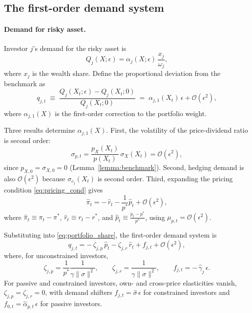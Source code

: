 \subsection{The first-order demand system}

\paragraph{Demand for risky asset.}  
Investor $j$’s demand for the risky asset is 
\[
    Q_j(X;\epsilon)=\alpha_j(X;\epsilon)\,\frac{x_j}{\omega_j},
\]
where $x_j$ is the wealth share. Define the proportional deviation from the benchmark as
\begin{equation}
    q_{j,t}\;\equiv\;\frac{Q_j(X_t;\epsilon)- Q_j(X_t;0)}{Q_j(X_t;0)}
    \;=\;\alpha_{j,1}(X_t)\,\epsilon+\mathcal{O}(\epsilon^2),
\end{equation}
where $\alpha_{j,1}(X)$ is the first-order correction to the portfolio weight.  

Three results determine $\alpha_{j,1}(X)$. First, the volatility of the price-dividend ratio is second order:
\[
    \sigma_{p,t}=\frac{p_X(X_t)}{p(X_t)}\,\sigma_X(X_t)=\mathcal{O}(\epsilon^2),
\]
since $p_{X,0}=\sigma_{X,0}=0$ (Lemma~\ref{lemma:benchmark}). Second, hedging demand is also $\mathcal{O}(\epsilon^2)$ because $\sigma_{c_j}(X_t)$ is second order. Third, expanding the pricing condition \eqref{eq:pricing_cond} gives
\begin{equation}
    \hat{\pi}_t=-\,\hat{r}_t-\frac{1}{p^*}\hat{p}_t+\mathcal{O}(\epsilon^2),
\end{equation}
where $\hat{\pi}_t\equiv \pi_t-\pi^*$, $\hat{r}_t\equiv r_t-r^*$, and $\hat{p}_t\equiv \frac{p_t-p^*}{p^*}$, using $\mu_{p,t}=\mathcal{O}(\epsilon^2)$.

Substituting into \eqref{eq:portfolio_share}, the first-order demand system is
\begin{equation}\label{eq:demand_risky}
    q_{j,t}=-\,\zeta_{j,p}\,\hat{p}_t-\zeta_{j,r}\,\hat{r}_t+f_{j,t}+\mathcal{O}(\epsilon^2),
\end{equation}
where, for unconstrained investors,
\[
    \zeta_{j,p}=\frac{1}{p^*}\frac{1}{\gamma\|\sigma\|^2}, 
    \qquad
    \zeta_{j,r}=\frac{1}{\gamma\|\sigma\|^2}, 
    \qquad
    f_{j,t}=-\,\hat{\gamma}_j\,\epsilon.
\]
For passive and constrained investors, own- and cross-price elasticities vanish, $\zeta_{j,p}=\zeta_{j,r}=0$, with demand shifters $f_{j,t}=\hat{\sigma}\,\epsilon$ for constrained investors and $f_{0,t}=\hat{\alpha}_{p,t}\,\epsilon$ for passive investors.  

